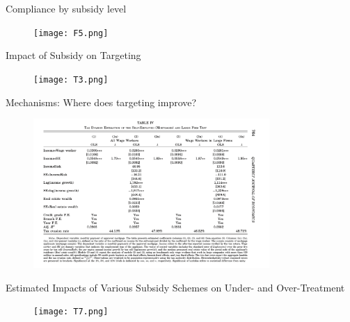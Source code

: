 \documentclass{beamer}
\begin{document}
    \begin{frame}{Compliance by subsidy level}
        \begin{figure}
            \texttt{[image: F5.png]}
        \end{figure}
            \end{frame}

\begin{frame}{Impact of Subsidy on Targeting}
\begin{figure}
    \texttt{[image: T3.png]}
\end{figure}
\end{frame}

\begin{frame}{Mechanisms: Where does targeting improve?}
\begin{figure}
    \includegraphics[width=0.8\textwidth, height=0.8\textheight]{T4.png}
\end{figure}

\end{frame}

\begin{frame}{Estimated Impacts of Various Subsidy Schemes on Under- and Over-Treatment}
    \begin{figure}
        \texttt{[image: T7.png]}
    \end{figure}
\end{frame}
\end{document}
